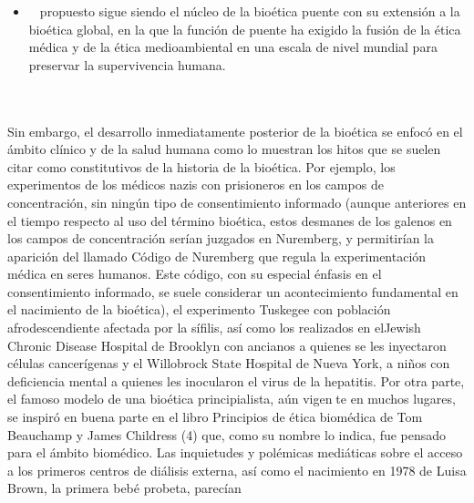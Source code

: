 \documentclass[12pt,letterpaper]{article}
\begin{document}
\begin{multicols}{2}
\\
\\
\\
\\
\\
\begin {itemize}
    \item[\textcolor{white}{x}]propuesto sigue siendo el núcleo de la bioética puente con su extensión a la bioética global, en la que la función de puente ha exigido la fusión 
de la ética médica y de la ética medioambiental en una escala de nivel mundial para preservar la supervivencia humana.
  \end{itemize} 
\\
\\
Sin embargo, el desarrollo inmediatamente posterior de la bioética se enfocó en el ámbito clínico y de la salud humana como lo muestran los hitos que se suelen citar como constitutivos de la historia de la bioética. Por ejemplo, los experimentos de los médicos nazis con prisioneros en los campos de concentración, sin ningún tipo de consentimiento informado (aunque anteriores en el tiempo respecto al uso del término bioética, estos desmanes de los galenos en los campos de concentración serían juzgados en Nuremberg, y permitirían la aparición del llamado Código de Nuremberg que regula la experimentación médica en seres humanos. Este código, con su especial énfasis en el consentimiento informado, se suele considerar un acontecimiento fundamental en el nacimiento de la bioética), el experimento Tuskegee con población afrodescendiente afectada por la sífilis, así 
como los realizados en elJewish Chronic Disease Hospital de Brooklyn con ancianos a quienes se les inyectaron células cancerígenas y el Willobrock State Hospital de Nueva York, a niños con deficiencia mental a quienes les inocularon el virus de la hepatitis. Por otra parte, el famoso modelo de una bioética principialista, aún vigente en muchos lugares, se inspiró en buena parte en el libro Principios de ética biomédica de Tom Beauchamp y James Childress (4) que, como su nombre lo indica, fue pensado para el ámbito biomédico. Las inquietudes y polémicas mediáticas sobre el acceso a los primeros centros de diálisis externa, así como el nacimiento en 1978 de Luisa Brown, la primera bebé probeta, parecían
\end{multicols}
\newpage
\end{document}
